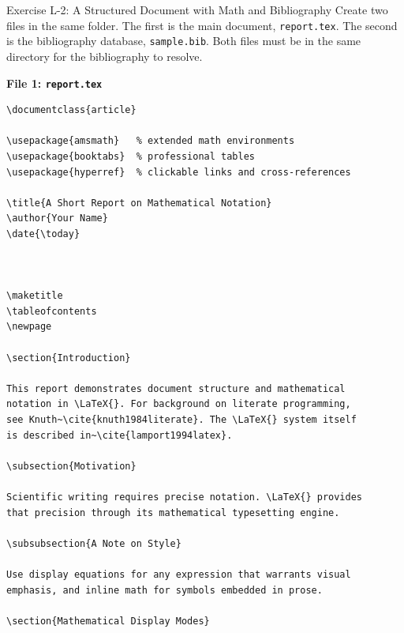 \begin{infobox}{Exercise L-2: A Structured Document with Math and Bibliography}
Create two files in the same folder. The first is the main document,
\texttt{report.tex}. The second is the bibliography database,
\texttt{sample.bib}. Both files must be in the same directory for the
bibliography to resolve.

\vs
\noindent
\textbf{File 1: \texttt{report.tex}}

\begin{lstlisting}[style=inlineStyle]
\documentclass{article}

\usepackage{amsmath}   % extended math environments
\usepackage{booktabs}  % professional tables
\usepackage{hyperref}  % clickable links and cross-references

\title{A Short Report on Mathematical Notation}
\author{Your Name}
\date{\today}



\maketitle
\tableofcontents
\newpage

\section{Introduction}

This report demonstrates document structure and mathematical
notation in \LaTeX{}. For background on literate programming,
see Knuth~\cite{knuth1984literate}. The \LaTeX{} system itself
is described in~\cite{lamport1994latex}.

\subsection{Motivation}

Scientific writing requires precise notation. \LaTeX{} provides
that precision through its mathematical typesetting engine.

\subsubsection{A Note on Style}

Use display equations for any expression that warrants visual
emphasis, and inline math for symbols embedded in prose.

\section{Mathematical Display Modes}


\end{lstlisting}
\end{infobox}

